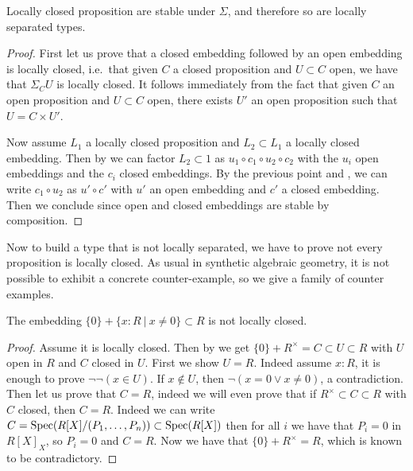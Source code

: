 \begin{lemma}\label{locally-closed-sigma-stable}
Locally closed proposition are stable under $\Sigma$, and therefore so are locally separated types.
\end{lemma}

\begin{proof}
First let us prove that a closed embedding followed by an open embedding is locally closed, i.e.\ that given $C$ a closed proposition and $U\subset C$ open, we have that $\Sigma_CU$ is locally closed. It follows immediately from the fact that given $C$ an open proposition and $U\subset C$ open, there exists $U'$ an open proposition such that $U = C\times U'$. 

Now assume $L_1$ a locally closed proposition and $L_2\subset L_1$ a locally closed embedding. Then by  we can factor $L_2\subset 1$ as $u_1\circ c_1\circ u_2\circ c_2$ with the $u_i$ open embeddings and the $c_i$ closed embeddings. By the previous point and , we can write $c_1\circ u_2$ as $u'\circ c'$ with $u'$ an open embedding and $c'$ a closed embedding. Then we conclude since open and closed embeddings are stable by composition.
\end{proof}

Now to build a type that is not locally separated, we have to prove not every proposition is locally closed. As usual in synthetic algebraic geometry, it is not possible to exhibit a concrete counter-example, so we give a family of counter examples.

\begin{lemma}\label{zero-or-invertible-not-locally-closed}
The embedding $\{0\}+\{x:R\ |\ x\not=0\} \subset R$ is not locally closed.
\end{lemma}

\begin{proof}
Assume it is locally closed. Then by  we get $\{0\}+R^\times = C \subset U \subset R$ with $U$ open in $R$ and $C$ closed in $U$. First we show $U=R$. Indeed assume $x:R$, it is enough to prove $\neg\neg(x\in U)$. If $x\not\in U$, then $\neg(x=0\lor x\not=0)$, a contradiction. Then let us prove that $C=R$, indeed we will even prove that if $R^\times \subset C\subset R$ with $C$ closed, then $C=R$. Indeed we can write $C = \operatorname{Spec}(R[X]/(P_1,\hdots,P_n)) \subset \operatorname{Spec}(R[X])$ then for all $i$ we have that $P_i = 0$ in $R[X]_X$, so $P_i=0$ and $C=R$. Now we have that $\{0\}+R^\times = R$, which is known to be contradictory.
\end{proof}



